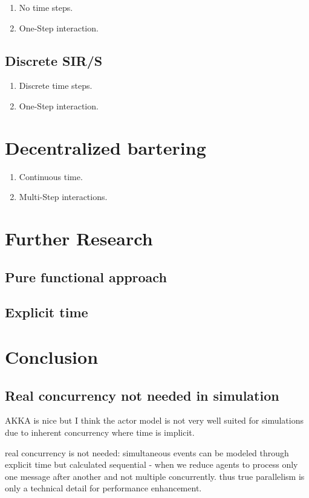 \documentclass{article}
\begin{document}
\begin{enumerate}
\item No time steps.
\item One-Step interaction.
\end{enumerate}

\subsection{Discrete SIR/S}
\begin{enumerate}
\item Discrete time steps.
\item One-Step interaction.
\end{enumerate}

\section{Decentralized bartering}

\begin{enumerate}
\item Continuous time.
\item Multi-Step interactions.
\end{enumerate}

\section{Further Research}
\subsection{Pure functional approach}
\subsection{Explicit time}

\section{Conclusion}
\subsection{Real concurrency not needed in simulation}
AKKA is nice but I think the actor model is not very well suited for simulations  due to inherent concurrency where time is implicit. 

real concurrency is not needed: simultaneous events can be modeled through explicit time but calculated sequential - when we reduce agents to process only one message after another and not multiple concurrently. thus true parallelism is only a technical detail for performance enhancement.






\end{document}
